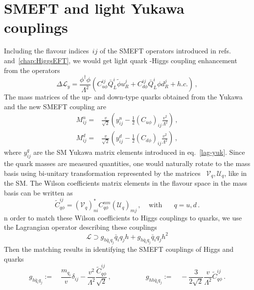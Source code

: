 \section{SMEFT and light Yukawa couplings\label{sec:EFTlightyuk}}
Including the flavour indices~$ij$ of the SMEFT operators introduced in refs.~\cite{Grzadkowski:2010es,Contino:2013kra} and~\autoref{chap:HiggsEFT}, we would get light quark -Higgs coupling enhancement from the operators
\begin{equation}
	\Delta \mathcal{L}_{y}=\frac{\phi^{\dagger}\phi}{\Lambda^2}\left( C_{u \phi}^{ij} \bar{Q}_L^i \tilde{\phi} u_R^j + C_{d \phi}^{ij} \bar{Q}_L^i \phi d_R^j +h.c.\right)\,,
	\label{eq:EFTop}
\end{equation}
  The mass matrices of the up- and down-type quarks obtained from the Yukawa and the new SMEFT coupling are
 \begin{align}
 	M^u_{ij} =& \frac{v}{\sqrt{2}} \left( y^u_{ij}-\frac{1}{2} (C_{u\phi})_{ij}\frac{v^2}{\Lambda^2}\right)\,,\nonumber\\
 	M^d_{ij} =& \frac{v}{\sqrt{2}} \left( y^d_{ij}-\frac{1}{2} (C_{d\phi})_{ij}\frac{v^2}{\Lambda^2}\right)\,, \label{eq:mass}
 \end{align}
where $y^q_{ij}$ are the SM Yukawa matrix elements introduced in eq.~\eqref{lag-yuk}. Since the quark masses are measured quantities, one would naturally rotate to the mass basis using bi-unitary transformation represented by the matrices ~$ \mathcal{V}_q, \mathcal{U}_q$, like in the SM. The Wilson coefficients matrix elements in the flavour space in the mass basis can be written as
\begin{equation}
	\tilde{C}_{q \phi}^{ij}= \left(\mathcal{V}_{q}\right)^*_{ni}C^{nm}_{q\phi}\left( \mathcal U_{q}\right)_{mj}\, , \; \; \; \;  \text{with } \;\;\;\;\; q = u,d\, .
\end{equation}
n order to match these Wilson coefficients to Higgs couplings to quarks, we use the Lagrangian operator describing these couplings
\begin{equation}
	\mathcal{L}\supset g_{h\bar{q}_i q_j}\bar{q}_i q_j h + g_{h\bar{q}_i q_j}\bar{q}_i q_j h^2
\end{equation}
Then the matching results in identifying the SMEFT couplings of Higgs and quarks
\begin{equation}
	g_{h\bar{q}_i q_j} := \quad \frac{m_{q_i}}{v}\delta_{ij}-\frac{v^2}{\Lambda^2} \frac{	\tilde{C}_{q \phi}^{ij}}{\sqrt{2}}\,, \quad \quad \quad \quad \quad g_{h h\bar{q}_i q_j} := \quad -\frac{3}{2\sqrt{2}}\frac{v}{\Lambda^2}	\tilde{C}_{q \phi}^{ij}\,. \label{eq:couplingsEFT}
\end{equation}

